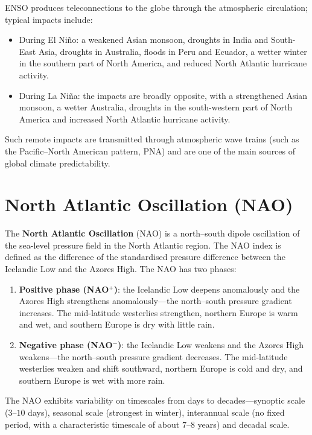 \begin{remark}
ENSO produces teleconnections to the globe through the atmospheric circulation; typical impacts include:
\begin{itemize}
    \item During El Niño: a weakened Asian monsoon, droughts in India and South-East Asia, droughts in Australia, floods in Peru and Ecuador, a wetter winter in the southern part of North America, and reduced North Atlantic hurricane activity.
    \item During La Niña: the impacts are broadly opposite, with a strengthened Asian monsoon, a wetter Australia, droughts in the south-western part of North America and increased North Atlantic hurricane activity.
\end{itemize}
Such remote impacts are transmitted through atmospheric wave trains (such as the Pacific--North American pattern, PNA) and are one of the main sources of global climate predictability.
\end{remark}

\section{North Atlantic Oscillation (NAO)}

\begin{definition}\label{def:nao}
The \textbf{North Atlantic Oscillation} (NAO) is a north--south dipole oscillation of the sea-level pressure field in the North Atlantic region. The NAO index is defined as the difference of the standardised pressure difference between the Icelandic Low and the Azores High. The NAO has two phases:
\begin{enumerate}[label=(\roman*)]
    \item \textbf{Positive phase (NAO$^+$)}: the Icelandic Low deepens anomalously and the Azores High strengthens anomalously---the north--south pressure gradient increases. The mid-latitude westerlies strengthen, northern Europe is warm and wet, and southern Europe is dry with little rain.
    \item \textbf{Negative phase (NAO$^-$)}: the Icelandic Low weakens and the Azores High weakens---the north--south pressure gradient decreases. The mid-latitude westerlies weaken and shift southward, northern Europe is cold and dry, and southern Europe is wet with more rain.
\end{enumerate}
The NAO exhibits variability on timescales from days to decades---synoptic scale ($3$--$10$ days), seasonal scale (strongest in winter), interannual scale (no fixed period, with a characteristic timescale of about $7$--$8$ years) and decadal scale.
\end{definition}

